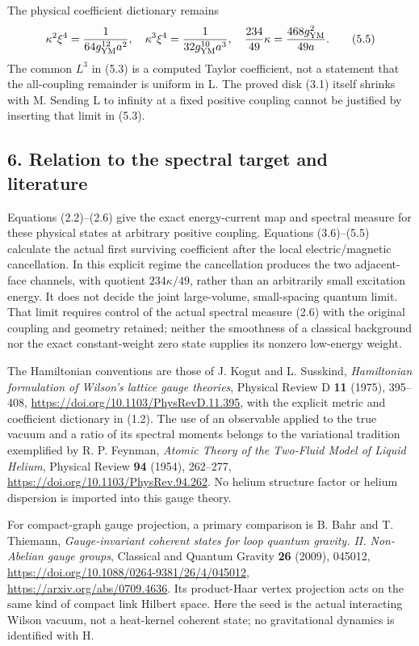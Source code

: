 \documentclass[
  11pt,
]{article}
\begin{document}
The physical coefficient dictionary remains \[
 \kappa^2\xi^4=\frac{1}{64g_{\rm YM}^{12}a^2},\quad
 \kappa^3\xi^4=\frac{1}{32g_{\rm YM}^{10}a^3},\quad
 \frac{234}{49}\kappa=\frac{468g_{\rm YM}^2}{49a}.
\tag{5.5}
\] The common \(L^3\) in (5.3) is a computed Taylor coefficient, not a
statement that the all-coupling remainder is uniform in L. The proved
disk (3.1) itself shrinks with M. Sending L to infinity at a fixed
positive coupling cannot be justified by inserting that limit in (5.3).

\subsection{6. Relation to the spectral target and
literature}\label{magnetic-part-3-relation-to-the-spectral-target-and-literature}

Equations (2.2)--(2.6) give the exact energy-current map and spectral
measure for these physical states at arbitrary positive coupling.
Equations (3.6)--(5.5) calculate the actual first surviving coefficient
after the local electric/magnetic cancellation. In this explicit regime
the cancellation produces the two adjacent-face channels, with quotient
\(234\kappa/49\), rather than an arbitrarily small excitation energy. It
does not decide the joint large-volume, small-spacing quantum limit.
That limit requires control of the actual spectral measure (2.6) with
the original coupling and geometry retained; neither the smoothness of a
classical background nor the exact constant-weight zero state supplies
its nonzero low-energy weight.

The Hamiltonian conventions are those of J. Kogut and L. Susskind,
\emph{Hamiltonian formulation of Wilson's lattice gauge theories},
Physical Review D \textbf{11} (1975), 395--408,
\url{https://doi.org/10.1103/PhysRevD.11.395}, with the explicit metric
and coefficient dictionary in (1.2). The use of an observable applied to
the true vacuum and a ratio of its spectral moments belongs to the
variational tradition exemplified by R. P. Feynman, \emph{Atomic Theory
of the Two-Fluid Model of Liquid Helium}, Physical Review \textbf{94}
(1954), 262--277, \url{https://doi.org/10.1103/PhysRev.94.262}. No
helium structure factor or helium dispersion is imported into this gauge
theory.

For compact-graph gauge projection, a primary comparison is B. Bahr and
T. Thiemann, \emph{Gauge-invariant coherent states for loop quantum
gravity. II. Non-Abelian gauge groups}, Classical and Quantum Gravity
\textbf{26} (2009), 045012,
\url{https://doi.org/10.1088/0264-9381/26/4/045012},
\url{https://arxiv.org/abs/0709.4636}. Its product-Haar vertex
projection acts on the same kind of compact link Hilbert space. Here the
seed is the actual interacting Wilson vacuum, not a heat-kernel coherent
state; no gravitational dynamics is identified with H.
\end{document}

